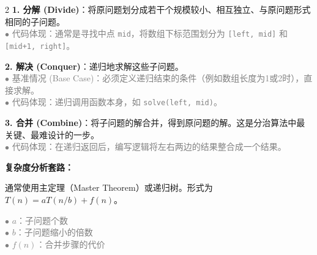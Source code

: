 \documentclass[10pt, a4paper]{article}
\begin{document}
\begin{multicols*}{2}
\textbf{1. 分解 (Divide)}：将原问题划分成若干个规模较小、相互独立、与原问题形式相同的子问题。\\
\textcolor{gray}{$\bullet$ 代码体现：通常是寻找中点 \texttt{mid}，将数组下标范围划分为 \texttt{[left, mid]} 和 \texttt{[mid+1, right]}。}

\textbf{2. 解决 (Conquer)}：递归地求解这些子问题。\\
\textcolor{gray}{$\bullet$ 基准情况 (Base Case)：必须定义递归结束的条件（例如数组长度为1或2时），直接求解。}\\
\textcolor{gray}{$\bullet$ 代码体现：递归调用函数本身，如 \texttt{solve(left, mid)}。}

\textbf{3. 合并 (Combine)}：将子问题的解合并，得到原问题的解。这是分治算法中最关键、最难设计的一步。\\
\textcolor{gray}{$\bullet$ 代码体现：在递归返回后，编写逻辑将左右两边的结果整合成一个结果。}

\vspace{0.3cm}
\textbf{复杂度分析套路：}

通常使用主定理（Master Theorem）或递归树。形式为 $T(n) = aT(n/b) + f(n)$。

\textcolor{gray}{$\bullet$ $a$：子问题个数}\\
\textcolor{gray}{$\bullet$ $b$：子问题缩小的倍数}\\
\textcolor{gray}{$\bullet$ $f(n)$：合并步骤的代价}


\end{multicols*}
\end{document}
